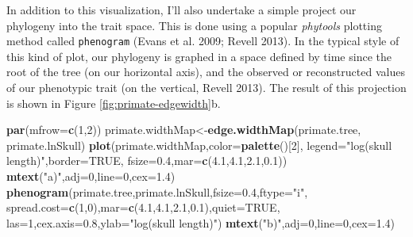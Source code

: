 \documentclass[fleqn,10pt,lineno]{wlpeerj} %
\newenvironment{Shaded}{\begin{snugshade}}{\end{snugshade}}
\newcommand{\AttributeTok}[1]{\textcolor[rgb]{0.13,0.29,0.53}{#1}}
\newcommand{\ConstantTok}[1]{\textcolor[rgb]{0.56,0.35,0.01}{#1}}
\newcommand{\DecValTok}[1]{\textcolor[rgb]{0.00,0.00,0.81}{#1}}
\newcommand{\FloatTok}[1]{\textcolor[rgb]{0.00,0.00,0.81}{#1}}
\newcommand{\FunctionTok}[1]{\textcolor[rgb]{0.13,0.29,0.53}{\textbf{#1}}}
\newcommand{\NormalTok}[1]{#1}
\newcommand{\OtherTok}[1]{\textcolor[rgb]{0.56,0.35,0.01}{#1}}
\newcommand{\StringTok}[1]{\textcolor[rgb]{0.31,0.60,0.02}{#1}}
\begin{document}
In addition to this visualization, I'll also undertake a simple project our phylogeny into the trait space. This is done using a popular \emph{phytools} plotting method called \texttt{phenogram} (Evans et al. 2009; Revell 2013). In the typical style of this kind of plot, our phylogeny is graphed in a space defined by time since the root of the tree (on our horizontal axis), and the observed or reconstructed values of our phenotypic trait (on the vertical, Revell 2013). The result of this projection is shown in Figure \ref{fig:primate-edgewidth}b.

\begin{Shaded}
\begin{Highlighting}[]
\FunctionTok{par}\NormalTok{(}\AttributeTok{mfrow=}\FunctionTok{c}\NormalTok{(}\DecValTok{1}\NormalTok{,}\DecValTok{2}\NormalTok{))}
\NormalTok{primate.widthMap}\OtherTok{\textless{}{-}}\FunctionTok{edge.widthMap}\NormalTok{(primate.tree,}
\NormalTok{  primate.lnSkull)}
\FunctionTok{plot}\NormalTok{(primate.widthMap,}\AttributeTok{color=}\FunctionTok{palette}\NormalTok{()[}\DecValTok{2}\NormalTok{],}
  \AttributeTok{legend=}\StringTok{"log(skull length)"}\NormalTok{,}\AttributeTok{border=}\ConstantTok{TRUE}\NormalTok{,}
  \AttributeTok{fsize=}\FloatTok{0.4}\NormalTok{,}\AttributeTok{mar=}\FunctionTok{c}\NormalTok{(}\FloatTok{4.1}\NormalTok{,}\FloatTok{4.1}\NormalTok{,}\FloatTok{2.1}\NormalTok{,}\FloatTok{0.1}\NormalTok{))}
\FunctionTok{mtext}\NormalTok{(}\StringTok{"a)"}\NormalTok{,}\AttributeTok{adj=}\DecValTok{0}\NormalTok{,}\AttributeTok{line=}\DecValTok{0}\NormalTok{,}\AttributeTok{cex=}\FloatTok{1.4}\NormalTok{)}
\FunctionTok{phenogram}\NormalTok{(primate.tree,primate.lnSkull,}\AttributeTok{fsize=}\FloatTok{0.4}\NormalTok{,}\AttributeTok{ftype=}\StringTok{"i"}\NormalTok{,}
  \AttributeTok{spread.cost=}\FunctionTok{c}\NormalTok{(}\DecValTok{1}\NormalTok{,}\DecValTok{0}\NormalTok{),}\AttributeTok{mar=}\FunctionTok{c}\NormalTok{(}\FloatTok{4.1}\NormalTok{,}\FloatTok{4.1}\NormalTok{,}\FloatTok{2.1}\NormalTok{,}\FloatTok{0.1}\NormalTok{),}\AttributeTok{quiet=}\ConstantTok{TRUE}\NormalTok{,}
  \AttributeTok{las=}\DecValTok{1}\NormalTok{,}\AttributeTok{cex.axis=}\FloatTok{0.8}\NormalTok{,}\AttributeTok{ylab=}\StringTok{"log(skull length)"}\NormalTok{)}
\FunctionTok{mtext}\NormalTok{(}\StringTok{"b)"}\NormalTok{,}\AttributeTok{adj=}\DecValTok{0}\NormalTok{,}\AttributeTok{line=}\DecValTok{0}\NormalTok{,}\AttributeTok{cex=}\FloatTok{1.4}\NormalTok{)}
\end{Highlighting}
\end{Shaded}
\end{document}
